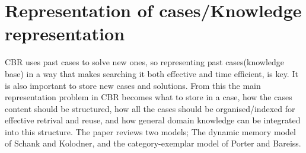 \documentclass[11pt, letterpaper]{report}
\numberwithin{equation}{section}
\begin{document}
\section{Representation of cases/Knowledge representation}
CBR uses past cases to solve new ones, so representing past cases(knowledge
base) in a way that makes searching it both effective and time efficient, is key.
It is also important to store new cases and solutions. From this the main
representation problem in CBR
becomes what to store in a case, how the cases content should be structured,
how all the cases should be organised/indexed for effective retrival and reuse,
and how general domain knowledge can be integrated into this structure. The
paper reviews two models; The dynamic memory model of Schank and Kolodner, and
the category-exemplar model of Porter and Bareiss.
\end{document}
